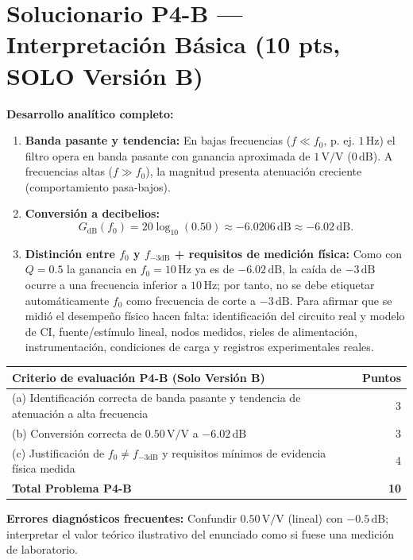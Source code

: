 \documentclass[10pt, a4paper]{article}
\begin{document}
\section*{Solucionario P4-B --- Interpretación Básica (10 pts, SOLO Versión B)}

\textbf{Desarrollo analítico completo:}
\begin{enumerate}
    \renewcommand{\labelenumi}{(\alph{enumi})}
    \setlength{\itemsep}{3pt}
    \item \textbf{Banda pasante y tendencia:} En bajas frecuencias ($f \ll f_0$, p. ej. $1\,\mathrm{Hz}$) el filtro opera en banda pasante con ganancia aproximada de $1\,\mathrm{V/V}$ ($0\,\mathrm{dB}$). A frecuencias altas ($f \gg f_0$), la magnitud presenta atenuación creciente (comportamiento pasa-bajos).
    \item \textbf{Conversión a decibelios:}
    \begin{equation}
        G_{\mathrm{dB}}(f_0) = 20\log_{10}(0.50) \approx -6.0206\,\mathrm{dB} \approx -6.02\,\mathrm{dB}.
    \end{equation}
    \item \textbf{Distinción entre $f_0$ y $f_{-3\mathrm{dB}}$ + requisitos de medición física:} Como con $Q = 0.5$ la ganancia en $f_0 = 10\,\mathrm{Hz}$ ya es de $-6.02\,\mathrm{dB}$, la caída de $-3\,\mathrm{dB}$ ocurre a una frecuencia inferior a $10\,\mathrm{Hz}$; por tanto, no se debe etiquetar automáticamente $f_0$ como frecuencia de corte a $-3\,\mathrm{dB}$. Para afirmar que se midió el desempeño físico hacen falta: identificación del circuito real y modelo de CI, fuente/estímulo lineal, nodos medidos, rieles de alimentación, instrumentación, condiciones de carga y registros experimentales reales.
\end{enumerate}

\begin{table}[htbp]
    \centering
    \footnotesize
    \begin{tabularx}{\textwidth}{@{}Xr@{}}
        \toprule
        \textbf{Criterio de evaluación P4-B (Solo Versión B)} & \textbf{Puntos} \\
        \midrule
        (a) Identificación correcta de banda pasante y tendencia de atenuación a alta frecuencia & 3 \\
        (b) Conversión correcta de $0.50\,\mathrm{V/V}$ a $-6.02\,\mathrm{dB}$ & 3 \\
        (c) Justificación de $f_0 \neq f_{-3\mathrm{dB}}$ y requisitos mínimos de evidencia física medida & 4 \\
        \midrule
        \textbf{Total Problema P4-B} & \textbf{10} \\
        \bottomrule
    \end{tabularx}
\end{table}

\noindent\textbf{Errores diagnósticos frecuentes:} Confundir $0.50\,\mathrm{V/V}$ (lineal) con $-0.5\,\mathrm{dB}$; interpretar el valor teórico ilustrativo del enunciado como si fuese una medición de laboratorio.
\end{document}
